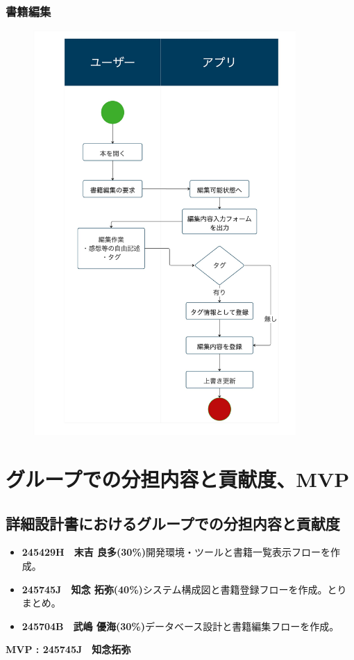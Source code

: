 \documentclass[a4paper, 11pt, titlepage]{jsarticle}
\begin{document}
\subsubsection{書籍編集}
\begin{figure}[h]
\centering
\includegraphics[width=100mm]{flow-henshu.jpg}
\label{fig:func}
\end{figure}

\section{グループでの分担内容と貢献度、MVP}%

\subsection{詳細設計書におけるグループでの分担内容と貢献度}
\begin{itemize}
    \item \textbf{245429H　末吉 良多(30\%)}開発環境・ツールと書籍一覧表示フローを作成。
    \item \textbf{245745J　知念 拓弥(40\%)}システム構成図と書籍登録フローを作成。とりまとめ。
    \item \textbf{245704B　武嶋 優海(30\%)}データベース設計と書籍編集フローを作成。
\end{itemize}

\textbf{MVP : 245745J　知念拓弥}
\end{document}

